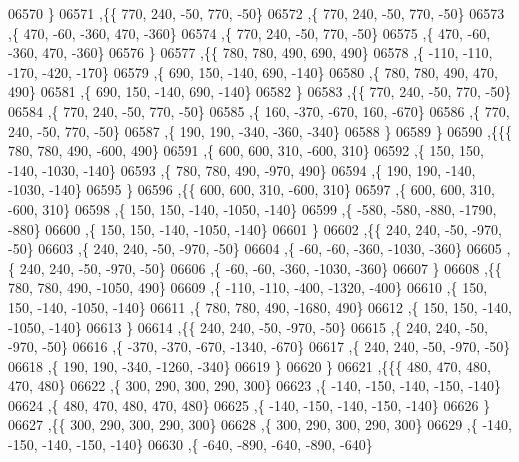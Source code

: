 \begin{DoxyCode}
06570     \}
06571    ,\{\{   770,   240,   -50,   770,   -50\}
06572     ,\{   770,   240,   -50,   770,   -50\}
06573     ,\{   470,   -60,  -360,   470,  -360\}
06574     ,\{   770,   240,   -50,   770,   -50\}
06575     ,\{   470,   -60,  -360,   470,  -360\}
06576     \}
06577    ,\{\{   780,   780,   490,   690,   490\}
06578     ,\{  -110,  -110,  -170,  -420,  -170\}
06579     ,\{   690,   150,  -140,   690,  -140\}
06580     ,\{   780,   780,   490,   470,   490\}
06581     ,\{   690,   150,  -140,   690,  -140\}
06582     \}
06583    ,\{\{   770,   240,   -50,   770,   -50\}
06584     ,\{   770,   240,   -50,   770,   -50\}
06585     ,\{   160,  -370,  -670,   160,  -670\}
06586     ,\{   770,   240,   -50,   770,   -50\}
06587     ,\{   190,   190,  -340,  -360,  -340\}
06588     \}
06589    \}
06590   ,\{\{\{   780,   780,   490,  -600,   490\}
06591     ,\{   600,   600,   310,  -600,   310\}
06592     ,\{   150,   150,  -140, -1030,  -140\}
06593     ,\{   780,   780,   490,  -970,   490\}
06594     ,\{   190,   190,  -140, -1030,  -140\}
06595     \}
06596    ,\{\{   600,   600,   310,  -600,   310\}
06597     ,\{   600,   600,   310,  -600,   310\}
06598     ,\{   150,   150,  -140, -1050,  -140\}
06599     ,\{  -580,  -580,  -880, -1790,  -880\}
06600     ,\{   150,   150,  -140, -1050,  -140\}
06601     \}
06602    ,\{\{   240,   240,   -50,  -970,   -50\}
06603     ,\{   240,   240,   -50,  -970,   -50\}
06604     ,\{   -60,   -60,  -360, -1030,  -360\}
06605     ,\{   240,   240,   -50,  -970,   -50\}
06606     ,\{   -60,   -60,  -360, -1030,  -360\}
06607     \}
06608    ,\{\{   780,   780,   490, -1050,   490\}
06609     ,\{  -110,  -110,  -400, -1320,  -400\}
06610     ,\{   150,   150,  -140, -1050,  -140\}
06611     ,\{   780,   780,   490, -1680,   490\}
06612     ,\{   150,   150,  -140, -1050,  -140\}
06613     \}
06614    ,\{\{   240,   240,   -50,  -970,   -50\}
06615     ,\{   240,   240,   -50,  -970,   -50\}
06616     ,\{  -370,  -370,  -670, -1340,  -670\}
06617     ,\{   240,   240,   -50,  -970,   -50\}
06618     ,\{   190,   190,  -340, -1260,  -340\}
06619     \}
06620    \}
06621   ,\{\{\{   480,   470,   480,   470,   480\}
06622     ,\{   300,   290,   300,   290,   300\}
06623     ,\{  -140,  -150,  -140,  -150,  -140\}
06624     ,\{   480,   470,   480,   470,   480\}
06625     ,\{  -140,  -150,  -140,  -150,  -140\}
06626     \}
06627    ,\{\{   300,   290,   300,   290,   300\}
06628     ,\{   300,   290,   300,   290,   300\}
06629     ,\{  -140,  -150,  -140,  -150,  -140\}
06630     ,\{  -640,  -890,  -640,  -890,  -640\}

\end{DoxyCode}
